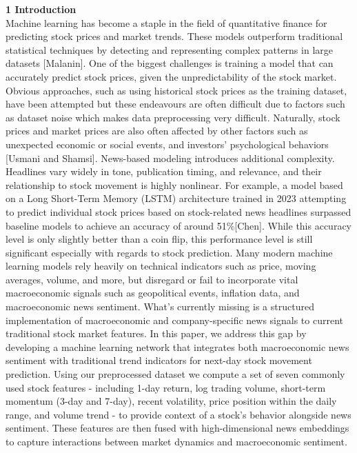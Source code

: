 \documentclass[letterpaper,12pt, twocolumn]{report}
\begin{document}
\newpage

\large
\noindent
\textbf{1 Introduction}\\
\normalsize
Machine learning has become a staple in the field of quantitative finance for predicting stock prices and market trends. These models outperform traditional statistical techniques by detecting and representing complex patterns in large datasets [Malanin]. 
One of the biggest challenges is training a model that can accurately predict stock prices, given the unpredictability of the stock market. Obvious approaches, such as using historical stock prices as the training dataset, have been attempted but these endeavours are often difficult due to factors such as dataset noise which makes data preprocessing very difficult. Naturally, stock prices and market prices are also often affected by other factors such as unexpected economic or social events, and investors’ psychological behaviors [Usmani and Shamsi].
News-based modeling introduces additional complexity. Headlines vary widely in tone, publication timing, and relevance, and their relationship to stock movement is highly nonlinear. For example, a model based on a Long Short-Term Memory (LSTM) architecture trained in 2023 attempting to predict individual stock prices based on stock-related news headlines surpassed baseline models to achieve an accuracy of around 51\%[Chen]. While this accuracy level is only slightly better than a coin flip, this performance level is still significant especially with regards to stock prediction.
Many modern machine learning models rely heavily on technical indicators such as price, moving averages,  volume, and more, but disregard or fail to incorporate vital macroeconomic signals such as geopolitical events, inflation data, and macroeconomic news sentiment. What’s currently missing is a structured implementation of macroeconomic and company-specific news signals to current traditional stock market features. 
In this paper, we address this gap by developing a machine learning network that integrates both macroeconomic news sentiment with traditional trend indicators for next-day stock movement prediction. Using our preprocessed dataset we compute a set of seven commonly used stock features -  including 1-day return, log trading volume, short-term momentum (3-day and 7-day), recent volatility, price position within the daily range, and volume trend - to provide context of a stock's behavior alongside news sentiment. These features are then fused with high-dimensional news embeddings to capture interactions between market dynamics and macroeconomic sentiment.
\end{document}
